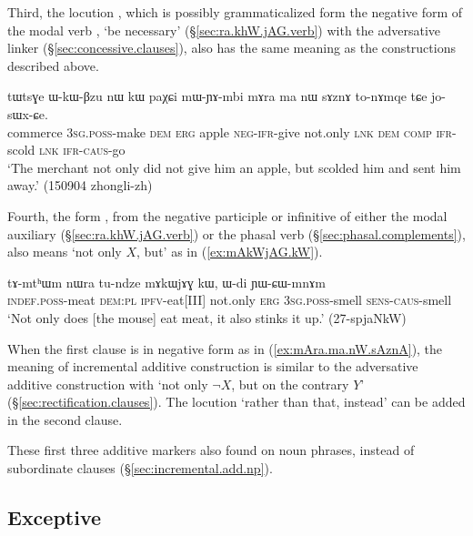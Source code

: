 Third, the locution , which is possibly grammaticalized form the negative form of the modal verb , `be necessary' (§\ref{sec:ra.khW.jAG.verb}) with the adversative linker  (§\ref{sec:concessive.clauses}), also has the same meaning as the constructions described above.

\begin{exe}
\ex \label{ex:mAra.ma.nW.sAznA}
\gll tɯtsɣe ɯ-kɯ-βzu nɯ kɯ paχɕi mɯ-ɲɤ-mbi mɤra ma nɯ sɤznɤ to-nɤmqe tɕe jo-sɯx-ɕe. \\
commerce \textsc{3sg}.\textsc{poss}-make \textsc{dem} \textsc{erg} apple \textsc{neg}-\textsc{ifr}-give not.only \textsc{lnk} \textsc{dem} \textsc{comp} \textsc{ifr}-scold \textsc{lnk} \textsc{ifr}-\textsc{caus}-go \\
\glt `The merchant not only did not give him an apple, but scolded him and sent him away.' (150904 zhongli-zh)
\end{exe}

Fourth, the form , from the negative participle or infinitive of either the modal auxiliary  (§\ref{sec:ra.khW.jAG.verb}) or the phasal verb  (§\ref{sec:phasal.complements}), also means `not only $X$, but' as in (\ref{ex:mAkWjAG.kW}).

 \begin{exe}
\ex \label{ex:mAkWjAG.kW}
\gll tɤ-mtʰɯm nɯra tu-ndze mɤkɯjɤɣ kɯ, ɯ-di ɲɯ-ɕɯ-mnɤm \\
\textsc{indef}.\textsc{poss}-meat \textsc{dem}:\textsc{pl} \textsc{ipfv}-eat[III] not.only \textsc{erg} \textsc{3sg}.\textsc{poss}-smell \textsc{sens}-\textsc{caus}-smell \\
\glt  `Not only does [the mouse] eat meat, it also stinks it up.' (27-spjaNkW)
\end{exe}


When the first clause is in negative form as in (\ref{ex:mAra.ma.nW.sAznA}), the meaning of incremental additive construction is similar to the adversative additive construction with  `not only $\neg X$, but on the contrary $Y$' (§\ref{sec:rectification.clauses}). The locution  `rather than that, instead' can be added in the second clause.

These first three additive markers also found on noun phrases, instead of subordinate clauses (§\ref{sec:incremental.add.np}).


\subsection{Exceptive} \label{sec:exceptive.clauses}

